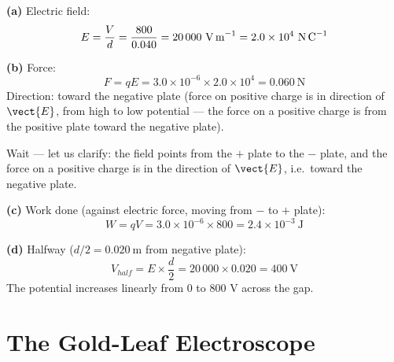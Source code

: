 \begin{solutionbox}
\textbf{(a)} Electric field:
\[
  E = \frac{V}{d} = \frac{800}{0.040}
  = 20\,000\ \text{V\,m}^{-1}
  = 2.0\times10^4\ \text{N\,C}^{-1}
\]

\textbf{(b)} Force:
\[
  F = qE = 3.0\times10^{-6} \times 2.0\times10^4
  = 0.060\ \text{N}
\]
Direction: toward the negative plate (force on
positive charge is in direction of $\vect{E}$,
from high to low potential --- the force on a
positive charge is from the positive plate toward
the negative plate).

Wait --- let us clarify: the field points from the
$+$ plate to the $-$ plate, and the force on a
positive charge is in the direction of $\vect{E}$,
i.e.\ toward the negative plate.

\textbf{(c)} Work done (against electric force,
moving from $-$ to $+$ plate):
\[
  W = qV = 3.0\times10^{-6} \times 800
  = 2.4\times10^{-3}\ \text{J}
\]

\textbf{(d)} Halfway ($d/2 = 0.020\ \text{m}$
from negative plate):
\[
  V_{half} = E \times \frac{d}{2}
  = 20\,000 \times 0.020 = 400\ \text{V}
\]
The potential increases linearly from 0 to 800 V
across the gap.
\end{solutionbox}

\section{The Gold-Leaf Electroscope}

